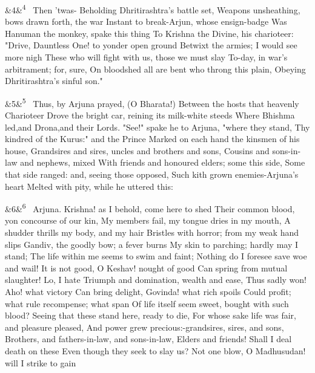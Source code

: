 \documentclass[12pt]{article}
\newcommand{\para}[1][]{\par\noindent\ifx&#1&\else\textsuperscript{\footnotesize #1}~\fi}
\begin{document}
\para[4] Then 'twas- Beholding Dhritirashtra's battle set, Weapons unsheathing, bows drawn forth, the war Instant to break-Arjun, whose ensign-badge Was Hanuman the monkey, spake this thing To Krishna the Divine, his charioteer: "Drive, Dauntless One! to yonder open ground Betwixt the armies; I would see more nigh These who will fight with us, those we must slay To-day, in war's arbitrament; for, sure, On bloodshed all are bent who throng this plain, Obeying Dhritirashtra's sinful son."

\para[5] Thus, by Arjuna prayed, (O Bharata!) Between the hosts that heavenly Charioteer Drove the bright car, reining its milk-white steeds Where Bhishma led,and Drona,and their Lords. "See!" spake he to Arjuna, "where they stand, Thy kindred of the Kurus:" and the Prince Marked on each hand the kinsmen of his house, Grandsires and sires, uncles and brothers and sons, Cousins and sons-in-law and nephews, mixed With friends and honoured elders; some this side, Some that side ranged: and, seeing those opposed, Such kith grown enemies-Arjuna's heart Melted with pity, while he uttered this:

\para[6] Arjuna. Krishna! as I behold, come here to shed Their common blood, yon concourse of our kin, My members fail, my tongue dries in my mouth, A shudder thrills my body, and my hair Bristles with horror; from my weak hand slips Gandiv, the goodly bow; a fever burns My skin to parching; hardly may I stand; The life within me seems to swim and faint; Nothing do I foresee save woe and wail! It is not good, O Keshav! nought of good Can spring from mutual slaughter! Lo, I hate Triumph and domination, wealth and ease, Thus sadly won! Aho! what victory Can bring delight, Govinda! what rich spoils Could profit; what rule recompense; what span Of life itself seem sweet, bought with such blood? Seeing that these stand here, ready to die, For whose sake life was fair, and pleasure pleased, And power grew precious:-grandsires, sires, and sons, Brothers, and fathers-in-law, and sons-in-law, Elders and friends! Shall I deal death on these Even though they seek to slay us? Not one blow, O Madhusudan! will I strike to gain
\end{document}

